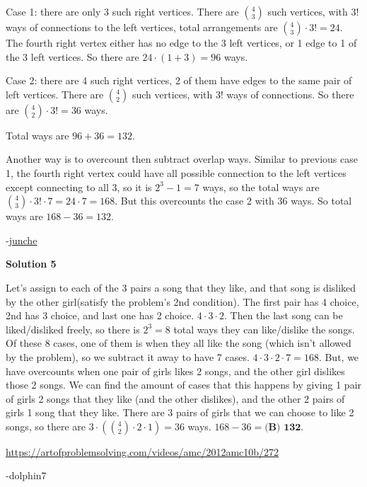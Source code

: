 \begin{enumerate}
 Case 1: there are only 3 such right vertices. There are $\binom{4}{3}$ such vertices, with $3!$ ways of connections to the left vertices, total arrangements are $\binom{4}{3}\cdot3! = 24$. The fourth right vertex either has no edge to the 3 left vertices, or 1 edge to 1 of the 3 left vertices.  So there are $24\cdot(1+3) = 96$ ways.

 Case 2: there are 4 such right vertices, 2 of them have edges to the same pair of left vertices.  There are $\binom{4}{2}$ such vertices, with $3!$ ways of connections.  So there are $\binom{4}{2}\cdot3! = 36$ ways.

 Total ways are $96+36=132$.

 Another way is to overcount then subtract overlap ways.  Similar to previous case 1,  the fourth right vertex could have all possible connection to the left vertices except connecting to all 3, so it is $2^3-1=7$ ways, so the total ways are $\binom{4}{3}\cdot3!\cdot7 = 24\cdot7 = 168$.  But this overcounts the case 2 with 36 ways.  So total ways are $168-36=132$.

 -\href{https://artofproblemsolving.com/wiki/index.php/User:Junche}{junche}

 



\textbf{Solution 5}

Let's assign to each of the 3 pairs a song that they like, and that song is disliked by the other girl(satisfy the problem's 2nd condition). The first pair has 4 choice, 2nd has 3 choice, and last one has 2 choice. $4 \cdot 3 \cdot 2$. Then the last song can be liked/disliked freely, so there is $2^3 = 8$ total ways they can like/dislike the songs. Of these 8 cases, one of them is when they all like the song (which isn't allowed by the problem), so we subtract it away to have 7 cases. $4 \cdot 3 \cdot 2 \cdot 7 = 168$. But, we have overcounts when one pair of girls likes 2 songs, and the other girl dislikes those 2 songs. We can find the amount of cases that this happens by giving 1 pair of girls 2 songs that they like (and the other dislikes), and the other 2 pairs of girls 1 song that they like. There are 3 pairs of girls that we can choose to like 2 songs, so there are $3 \cdot \left(\binom {4}{2} \cdot 2 \cdot 1\right) = 36$ ways. $168 - 36 = \boxed {\textbf{(B) 132}}$.

 \href{https://artofproblemsolving.com/videos/amc/2012amc10b/272}{https://artofproblemsolving.com/videos/amc/2012amc10b/272}

 -dolphin7


\end{enumerate}
